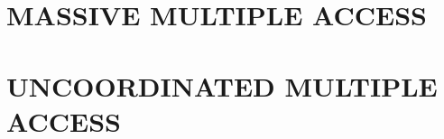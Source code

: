 \documentclass[12pt]{report}
\begin{document}
\renewcommand{\tamumanuscripttitle}{Applications of Coding Theory to Massive Multiple Access and Big Data Problems}

\renewcommand{\tamupapertype}{Dissertation}

\renewcommand{\tamufullname}{Avinash Vem}

\renewcommand{\tamudegree}{Doctor of Philosophy}
\renewcommand{\tamuchairone}{Krishna R. Narayanan}


\renewcommand{\tamumemberone}{Arun R. Srinivasa}
\newcommand{\tamumembertwo}{Jean-Francois Chamberland}
\newcommand{\tamumemberthree}{Alex Sprintson}
\renewcommand{\tamudepthead}{Miroslav M. Begovic}

\renewcommand{\tamugradmonth}{December}
\renewcommand{\tamugradyear}{2017}
\renewcommand{\tamudepartment}{Electrical Engineering}



%
%
%
%



%
\chapter{MASSIVE MULTIPLE ACCESS}
\label{chap:MAC}


\chapter{UNCOORDINATED MULTIPLE ACCESS}
\label{chap:uncoord_mac}

\end{document}
